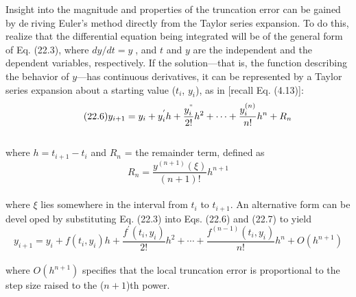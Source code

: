Insight into the magnitude and properties of the truncation error can be gained by deriving Euler’s method directly from the Taylor series expansion. To do this, realize that the
differential equation being integrated will be of the general form of Eq. (22.3), where
$dy/dt = y$, and $t$ and $y$ are the independent and the dependent variables, respectively. If
the solution—that is, the function describing the behavior of $y$—has continuous derivatives,
it can be represented by a Taylor series expansion about a starting value ($t_{i}$, $y_{i}$), as in
[recall Eq. (4.13)]:\\
\begin{equation}
\tag{22.6}
y_{i+1} = y_{i} + y^{'}_{i}h + \dfrac{y^{"}_{i}}{2!}h^2 + \cdots + \dfrac{y^{(n)}_{i}}{n!}h^n + R_{n}
\end{equation}\\
where $h = t_{i+1} − t_{i}$ and $R_{n}$ = the remainder term, defined as\\
\begin{equation}
\tag{22.7}
R_{n} = \dfrac{y^{(n+1)}(\xi)}{(n+1)!}h^{n+1}
\end{equation}\\
where $\xi$ lies somewhere in the interval from $t_{i}$ to $t_{i+1}$. An alternative form can be developed by substituting Eq. (22.3) into Eqs. (22.6) and (22.7) to yield\\
\begin{equation}
\tag{22.8}
y_{i+1} = y_{i} + f(t_{i},y_{i})h + \dfrac{f^{'} (t_{i}, y_{i})}{2!}h^2 + \cdots + \dfrac{f^{(n-1)} (t_{i}, y_{i})}{n!}h^n + O(h^{n+1})
\end{equation}\\
where $O(h^{n+1})$ specifies that the local truncation error is proportional to the step size
raised to the ($n + 1$)th power.

